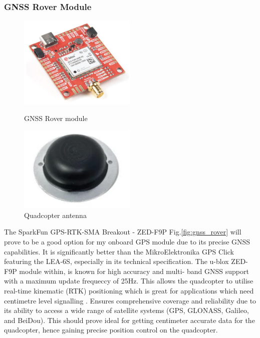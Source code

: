 \documentclass{article}
\begin{document}
\subsubsection{GNSS Rover Module}
  \begin{figure}[H]
    \begin{minipage}{0.5\textwidth}
      \centering
      \includegraphics[width=0.5\textwidth]{Pictures/gnss_rover.png}
      \caption{GNSS Rover module}
      \label{fig:gnss_rover}
    \end{minipage}
    \begin{minipage}{0.5\textwidth}
      \centering
      \includegraphics[width=0.5\textwidth]{Pictures/quad_antenna.png}
      \caption{Quadcopter antenna}
      \label{fig:Quadcopter antenna}
  \end{minipage}
\end{figure}
The SparkFun GPS-RTK-SMA Breakout - ZED-F9P Fig.\ref{fig:gnss_rover} will prove
to be a good option for my onboard GPS module due to its precise GNSS
capabilities. It is significantly better than the MikroElektronika GPS Click
featuring the LEA-6S, especially in its technical specification. The u-blox
ZED-F9P module within, is known for high accuracy and multi- band GNSS support
with a maximum update frequeccy of 25Hz. This allows the quadcopter to utilise
real-time kinematic (RTK) positioning which is great for applications which need
centimetre level signalling \cite{sbg_systems_2024}. Ensures comprehensive
coverage and reliability due to its ability to access a wide range of satellite
systems (GPS, GLONASS, Galileo, and BeiDou). This should prove ideal for getting
centimeter accurate data for the quadcopter, hence gaining precise position
control on the quadcopter.
\end{document}
